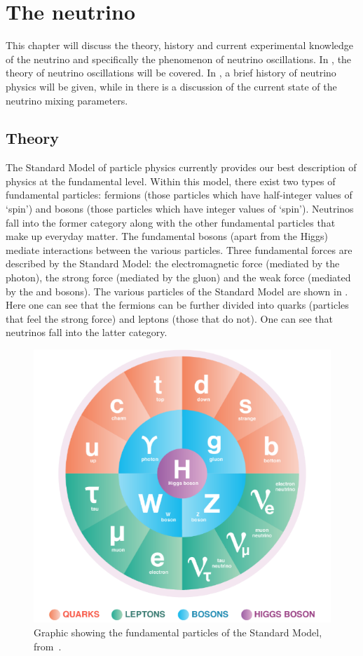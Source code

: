 \chapter{The neutrino}
\label{sec:theory}

This chapter will discuss the theory, history and current experimental knowledge of the neutrino and specifically the phenomenon of neutrino oscillations.
In , the theory of neutrino oscillations will be covered.
In , a brief history of neutrino physics will be given, while in  there is a discussion of the current state of the neutrino mixing parameters.

\section{Theory}
\label{sec:theory:theory}

The Standard Model of particle physics currently provides our best description of physics at the fundamental level.
Within this model, there exist two types of fundamental particles: fermions (those particles which have half-integer values of `spin') and bosons (those particles which have integer values of `spin').
Neutrinos fall into the former category along with the other fundamental particles that make up everyday matter.
The fundamental bosons (apart from the Higgs) mediate interactions between the various particles.
Three fundamental forces are described by the Standard Model: the electromagnetic force (mediated by the photon), the strong force (mediated by the gluon) and the weak force (mediated by the \wpm and \zboson bosons).
The various particles of the Standard Model are shown in .
Here one can see that the fermions can be further divided into quarks (particles that feel the strong force) and leptons (those that do not).
One can see that neutrinos fall into the latter category.

\begin{figure}
	\centering
	\includegraphics[width=.6\linewidth]{files/figures/theory/SMParticles}
	\caption[Graphic showing the fundamental particles of the Standard Model]{Graphic showing the fundamental particles of the Standard Model, from~\cite{SMImage}.}
	\label{fig:SMParticles}
\end{figure}

